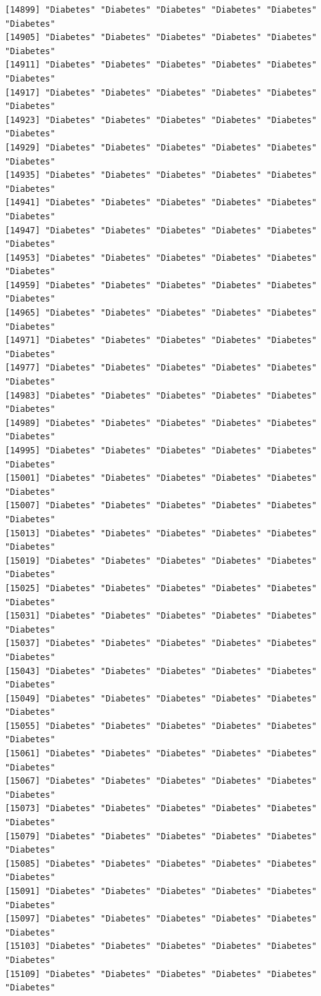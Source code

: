 \documentclass[
  letterpaper,
  DIV=11,
  numbers=noendperiod]{scrartcl}
\begin{document}
\begin{verbatim}
[14899] "Diabetes" "Diabetes" "Diabetes" "Diabetes" "Diabetes" "Diabetes"
[14905] "Diabetes" "Diabetes" "Diabetes" "Diabetes" "Diabetes" "Diabetes"
[14911] "Diabetes" "Diabetes" "Diabetes" "Diabetes" "Diabetes" "Diabetes"
[14917] "Diabetes" "Diabetes" "Diabetes" "Diabetes" "Diabetes" "Diabetes"
[14923] "Diabetes" "Diabetes" "Diabetes" "Diabetes" "Diabetes" "Diabetes"
[14929] "Diabetes" "Diabetes" "Diabetes" "Diabetes" "Diabetes" "Diabetes"
[14935] "Diabetes" "Diabetes" "Diabetes" "Diabetes" "Diabetes" "Diabetes"
[14941] "Diabetes" "Diabetes" "Diabetes" "Diabetes" "Diabetes" "Diabetes"
[14947] "Diabetes" "Diabetes" "Diabetes" "Diabetes" "Diabetes" "Diabetes"
[14953] "Diabetes" "Diabetes" "Diabetes" "Diabetes" "Diabetes" "Diabetes"
[14959] "Diabetes" "Diabetes" "Diabetes" "Diabetes" "Diabetes" "Diabetes"
[14965] "Diabetes" "Diabetes" "Diabetes" "Diabetes" "Diabetes" "Diabetes"
[14971] "Diabetes" "Diabetes" "Diabetes" "Diabetes" "Diabetes" "Diabetes"
[14977] "Diabetes" "Diabetes" "Diabetes" "Diabetes" "Diabetes" "Diabetes"
[14983] "Diabetes" "Diabetes" "Diabetes" "Diabetes" "Diabetes" "Diabetes"
[14989] "Diabetes" "Diabetes" "Diabetes" "Diabetes" "Diabetes" "Diabetes"
[14995] "Diabetes" "Diabetes" "Diabetes" "Diabetes" "Diabetes" "Diabetes"
[15001] "Diabetes" "Diabetes" "Diabetes" "Diabetes" "Diabetes" "Diabetes"
[15007] "Diabetes" "Diabetes" "Diabetes" "Diabetes" "Diabetes" "Diabetes"
[15013] "Diabetes" "Diabetes" "Diabetes" "Diabetes" "Diabetes" "Diabetes"
[15019] "Diabetes" "Diabetes" "Diabetes" "Diabetes" "Diabetes" "Diabetes"
[15025] "Diabetes" "Diabetes" "Diabetes" "Diabetes" "Diabetes" "Diabetes"
[15031] "Diabetes" "Diabetes" "Diabetes" "Diabetes" "Diabetes" "Diabetes"
[15037] "Diabetes" "Diabetes" "Diabetes" "Diabetes" "Diabetes" "Diabetes"
[15043] "Diabetes" "Diabetes" "Diabetes" "Diabetes" "Diabetes" "Diabetes"
[15049] "Diabetes" "Diabetes" "Diabetes" "Diabetes" "Diabetes" "Diabetes"
[15055] "Diabetes" "Diabetes" "Diabetes" "Diabetes" "Diabetes" "Diabetes"
[15061] "Diabetes" "Diabetes" "Diabetes" "Diabetes" "Diabetes" "Diabetes"
[15067] "Diabetes" "Diabetes" "Diabetes" "Diabetes" "Diabetes" "Diabetes"
[15073] "Diabetes" "Diabetes" "Diabetes" "Diabetes" "Diabetes" "Diabetes"
[15079] "Diabetes" "Diabetes" "Diabetes" "Diabetes" "Diabetes" "Diabetes"
[15085] "Diabetes" "Diabetes" "Diabetes" "Diabetes" "Diabetes" "Diabetes"
[15091] "Diabetes" "Diabetes" "Diabetes" "Diabetes" "Diabetes" "Diabetes"
[15097] "Diabetes" "Diabetes" "Diabetes" "Diabetes" "Diabetes" "Diabetes"
[15103] "Diabetes" "Diabetes" "Diabetes" "Diabetes" "Diabetes" "Diabetes"
[15109] "Diabetes" "Diabetes" "Diabetes" "Diabetes" "Diabetes" "Diabetes"

\end{verbatim}
\end{document}
